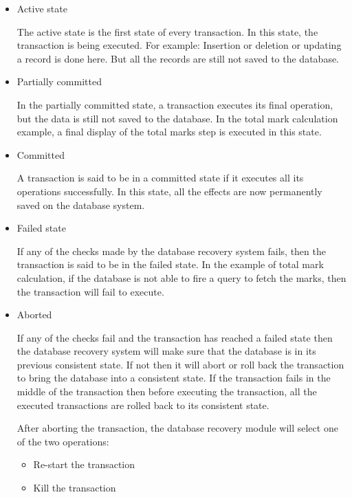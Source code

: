 \documentclass{article}
\begin{document}
\begin{itemize}

\item Active state

The active state is the first state of every transaction. In this state, the transaction is being executed.
For example: Insertion or deletion or updating a record is done here. But all the records are still not saved to the database.

\item Partially committed

In the partially committed state, a transaction executes its final operation, but the data is still not saved to the database.
In the total mark calculation example, a final display of the total marks step is executed in this state.

\item Committed

A transaction is said to be in a committed state if it executes all its operations successfully. In this state, all the effects are now permanently saved on the database system.

\item Failed state

If any of the checks made by the database recovery system fails, then the transaction is said to be in the failed state.
In the example of total mark calculation, if the database is not able to fire a query to fetch the marks, then the transaction will fail to execute.

\item Aborted

If any of the checks fail and the transaction has reached a failed state then the database recovery system will make sure that the database is in its previous consistent state. If not then it will abort or roll back the transaction to bring the database into a consistent state.
If the transaction fails in the middle of the transaction then before executing the transaction, all the executed transactions are rolled back to its consistent state.

After aborting the transaction, the database recovery module will select one of the two operations:
\begin{itemize}
\item Re-start the transaction
\item Kill the transaction
\end{itemize}

\end{itemize}
\end{document}
